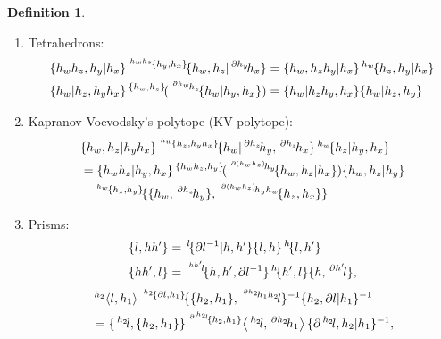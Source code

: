 \documentclass[11pt, reqno]{amsart} %
\newcommand{\act}[1]{\,\sp{#1}\!}
\theoremstyle{definition}
\newtheorem{definition}[theorem]{Definition}
\theoremstyle{remark}
\numberwithin{equation}{section}
\begin{document}
\begin{definition}
\begin{enumerate}
\begin{align}
    \nonumber
    \partial\{h_z,h_y|h_x\} &= \{h_zh_y,h_x\}\{h_z,\act{\partial h_y}h_x\}^{-1}\act{h_z}\{h_y,h_x\}^{-1}, \\
    \nonumber
    \partial\{h_z|h_y,h_x\} &= \{h_z,h_yh_x\}\act{\act{\partial h_z}h_y}\{h_z,h_x\}^{-1}\{h_z,h_y\}^{-1}.
  \end{align}
    \item \label{ax:3CM-Tetrahedrons}Tetrahedrons:
      \begin{align}
        \label{eq:3-CM-Fund-left-Hom}
        \{h_wh_z,h_y|h_x\}\act{\act{h_wh_z}\{h_y,h_x\}}\{h_w,h_z|\act{\partial h_y}h_x\} &= \{h_w,h_zh_y|h_x\}\act{h_w}\{h_z,h_y|h_x\} \\
        \label{eq:3-CM-Fund-right-Hom}
        \{h_w|h_z,h_yh_x\}\act{\{h_w,h_z\}}(\act{\act{\partial h_w}h_z}\{h_w|h_y,h_x\}) &= \{h_w|h_zh_y,h_x\}\{h_w|h_z,h_y\}
      \end{align}
    \item \label{ax:3CM-KV}Kapranov-Voevodsky's polytope (KV-polytope):
      \begin{align}
        \nonumber
        &\{h_w,h_z|h_yh_x\}\act{\act{h_w}\{h_z,h_yh_x\}}\{h_w|\act{\partial h_z}h_y,\act{\partial h_z}h_x\}\act{h_w}\{h_z|h_y,h_x\} \\
        \nonumber
        &= \{h_wh_z|h_y,h_x\}\act{\{h_wh_z,h_y\}}(\act{\act{\partial (h_wh_z)}h_y}\{h_w,h_z|h_x\})\{h_w,h_z|h_y\} \\
        \label{eq:3CM-KV}
        &\quad 
        \act{\act{h_w}\{h_z,h_y\}}\{\{h_w,\act{\partial h_z}h_y\},\act{\act{\partial(h_wh_z)}h_yh_w}\{h_z,h_x\}\}
      \end{align}
  \item Prisms: \label{ax:3CM-Prisms}
      \begin{align}
        \label{eq:3CM-L-HH}
        \{l,hh'\} &= \act{l}\{\partial l^{-1}|h,h'\}\{l,h\}\act{h}\{l,h'\} \\
        \label{eq:3CM-HH-L}
        \{hh',l\} &= \act{\act{hh'}l}\{h,h',\partial l^{-1}\}\act{h}\{h',l\}\{h,\act{\partial h'}l\},
      \end{align}
      \begin{align}
         \label{eq:3cm_prism23-2}
        &\act{h_2}\left<l,h_1\right>\act{\act{h_2}\{\partial l,h_1\}}\{\{h_2,h_1\},\act{\act{\partial h_2}h_1h_2}l\}^{-1}\{h_2,\partial l|h_1\}^{-1} \\
        \nonumber
        &= \{\act{h_2}l,\{h_2,h_1\}\}\act{\act{\partial\act{h_2}l}\{h_2,h_1\}}\left<\act{h_2}l,\act{\partial h_2}h_1\right>\{\partial\act{h_2}l,h_2|h_1\}^{-1},

\end{align}
\end{enumerate}
\end{definition}
\end{document}
